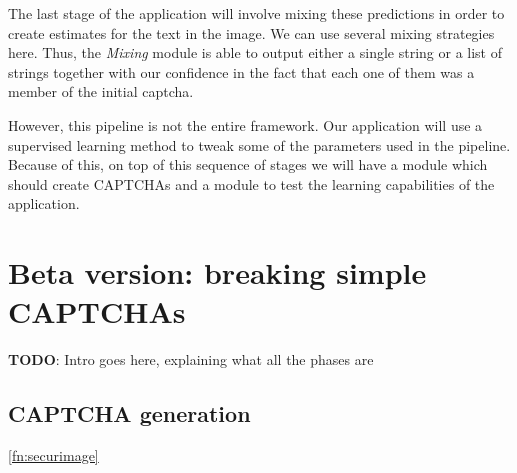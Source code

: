 \documentclass[a4paper,12pt]{article}
\begin{document}
The last stage of the application will involve mixing these predictions in
order to create estimates for the text in the image. We can use several mixing
strategies here. Thus, the \textit{Mixing} module is able to output either a
single string or a list of strings together with our confidence in the fact
that each one of them was a member of the initial captcha.

However, this pipeline is not the entire framework. Our application will use a
supervised learning method to tweak some of the parameters used in the
pipeline. Because of this, on top of this sequence of stages we will have a
module which should create CAPTCHAs and a module to test the learning
capabilities of the application.

\section*{Beta version: breaking simple CAPTCHAs}

\textbf{TODO}: Intro goes here, explaining what all the phases are

\subsection*{CAPTCHA generation}

\ref{fn:securimage}

\vskip 0.2in


\end{document}
